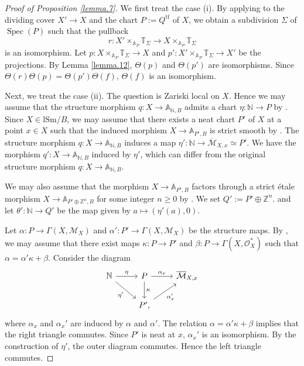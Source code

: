 \documentclass[10pt]{amsart}
\theoremstyle{definition}
\theoremstyle{remark}
\numberwithin{equation}{subsection}
\newcommand{\A}{\mathbb{A}}
\newcommand{\N}{\mathbb{N}}
\newcommand{\T}{\mathbb{T}}
\newcommand{\Z}{\mathbb{Z}}
\newcommand{\cM}{\mathcal{M}}
\newcommand{\cO}{\mathcal{O}}
\DeclareMathOperator{\Spec}{Spec}
\newcommand{\ol}{\overline}
\newcommand{\tf}{\mathrm{tf}}
\newcommand{\lSm}{\mathrm{lSm}}
\begin{document}
\begin{proof}[Proof of Proposition \ref{lemma.7}]
We first treat the case (i).
By applying \cite[Proposition A.11.5]{logDM} to the dividing cover $X'\to X$ and the chart $P:=Q^\tf$ of $X$,
we obtain a subdivision $\Sigma$ of $\Spec(P)$ such that the pullback
\[
r\colon X'\times_{\A_P}\T_{\Sigma}\to X\times_{\A_P}\T_{\Sigma}
\]
is an isomorphism.
Let $p\colon X\times_{\A_P}\T_\Sigma\to X$ and $p'\colon X'\times_{\A_P}\T_\Sigma\to X'$ be the projections.
By Lemma \ref{lemma.12}, $\Theta(p)$ and $\Theta(p')$ are isomorphisms.
Since $\Theta(r)\Theta(p)=\Theta(p')\Theta(f)$, $\Theta(f)$ is an isomorphism.

Next, we treat the case (ii).
The question is Zariski local on $X$.
Hence we may assume that the structure morphism $q\colon X\to \A_{\N,B}$ admits a chart $\eta\colon \N\to P$ by \cite[Proposition II.2.4.2]{Ogu}.
Since $X\in \lSm/B$, we may assume that there exists a neat chart $P'$ of $X$ at a point $x\in X$ such that the induced morphism $X\to \A_{P',B}$ is strict smooth by \cite[Lemma A.5.9]{logDM}.
The structure morphism $q\colon X\to \A_{\N,B}$ induces a map $\eta'\colon \N \to \ol{\cM}_{X,x}\simeq P'$.
We have the morphism $q'\colon X\to \A_{\N,B}$ induced by $\eta'$,
which can differ from the original structure morphism $q\colon X\to \A_{\N,B}$.

We may also assume that the morphism $X\to \A_{P',B}$ factors through a strict \'etale morphism $X\to \A_{P'\oplus \Z^n,B}$ for some integer $n\geq 0$ by \cite[Corollaire IV.17.11.4]{SGA4}.
We set $Q':=P'\oplus \Z^n$.
and let $\theta'\colon \N\to Q'$ be the map given by $a\mapsto (\eta'(a),0)$.

Let $\alpha \colon P\to \Gamma(X,\cM_X)$ and $\alpha'\colon P'\to \Gamma(X,\cM_X)$ be the structure maps.
By \cite[Proposition II,2.3.9]{Ogu},
we may assume that there exist maps $\kappa\colon P\to P'$ and $\beta\colon P\to \Gamma(X,\cO_X^*)$ such that $\alpha=\alpha'\kappa+\beta$.
Consider the diagram
\[
\begin{tikzcd}
\N\ar[r,"\eta"]\ar[rd,"\eta'"']&
P\ar[r,"\alpha_x"]\ar[d,"\kappa"]&
\ol{\cM}_{X,x}
\\
&
P',\ar[ru,"\alpha_x'"']
\end{tikzcd}
\]
where $\alpha_x$ and $\alpha_x'$ are induced by $\alpha$ and $\alpha'$.
The relation $\alpha=\alpha'\kappa+\beta$ implies that the right triangle commutes. Since $P'$ is neat at $x$, $\alpha_x'$ is an isomorphism.
By the construction of $\eta'$,
the outer diagram commutes.
Hence the left triangle commutes.


\end{proof}
\end{document}
